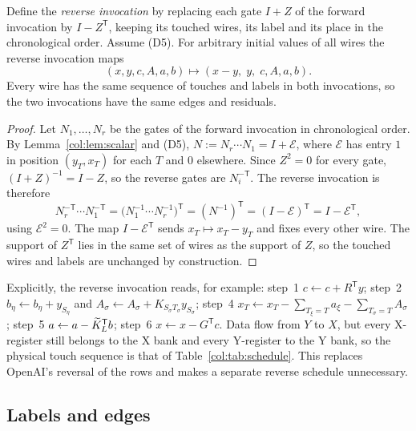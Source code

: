 \begin{lemma}\label{col:lem:reverse}
Define the \emph{reverse invocation} by replacing each gate $I+Z$ of the forward invocation by
$I-Z^{\mathsf T}$, keeping its touched wires, its label and its place in the chronological order. Assume
(D5). For arbitrary initial values of all wires the reverse invocation maps
\[
  (x,y,c,A,a,b)\longmapsto(x-y,\;y,\;c,A,a,b).
\]
Every wire has the same sequence of touches and labels in both invocations, so the two invocations have
the same edges and residuals.
\end{lemma}

\begin{proof}
Let $N_1,\dots,N_r$ be the gates of the forward invocation in chronological order. By
Lemma~\ref{col:lem:scalar} and (D5), $N:=N_r\cdots N_1=I+\mathcal E$, where $\mathcal E$ has entry $1$ in
position $(y_T,x_T)$ for each $T$ and $0$ elsewhere. Since $Z^2=0$ for every gate,
$(I+Z)^{-1}=I-Z$, so the reverse gates are $N_i^{-\mathsf T}$. The reverse invocation is therefore
\[
  N_r^{-\mathsf T}\cdots N_1^{-\mathsf T}=\big(N_1^{-1}\cdots N_r^{-1}\big)^{\mathsf T}=(N^{-1})^{\mathsf T}
  =(I-\mathcal E)^{\mathsf T}=I-\mathcal E^{\mathsf T},
\]
using $\mathcal E^2=0$. The map $I-\mathcal E^{\mathsf T}$ sends $x_T\mapsto x_T-y_T$ and fixes every other wire.
The support of $Z^{\mathsf T}$ lies in the same set of wires as the support of $Z$, so the touched wires
and labels are unchanged by construction.
\end{proof}

\begin{remark}\label{col:rem:reverse}
Explicitly, the reverse invocation reads, for example: step~1 $c\leftarrow c+R^{\mathsf T}y$;
step~2 $b_\eta\leftarrow b_\eta+y_{S_\eta}$ and $A_\sigma\leftarrow A_\sigma+K_{S_\sigma T_\sigma}y_{S_\sigma}$;
step~4 $x_T\leftarrow x_T-\sum_{T_\xi=T}a_\xi-\sum_{T_\sigma=T}A_\sigma$; step~5
$a\leftarrow a-\widetilde K_L^{\mathsf T}b$; step~6 $x\leftarrow x-G^{\mathsf T}c$. Data flow from $Y$ to $X$,
but every X-register still belongs to the X bank and every Y-register to the Y bank, so the physical
touch sequence is that of Table~\ref{col:tab:schedule}. This replaces OpenAI's reversal of the rows
\cite[\S2.3, after (2.7)]{oai} and makes a separate reverse schedule unnecessary.
\end{remark}

\subsection{Labels and edges}\label{col:sec:edges}

